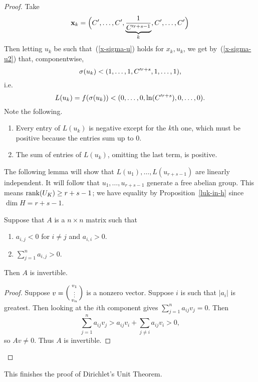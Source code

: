 \begin{proof}
Take
\[
\mathbf x_k=\Big(C',\ldots, C', \underbrace{\frac{1}{C'^{r+s-1}}}_{k},C',\ldots, C'\Big)
\]
Then letting $u_k$ be such that~(\ref{x-sigma-u}) holds for $x_k,u_k$, we get by~(\ref{x-sigma-u2}) that, componentwise,
\[
\sigma(u_k)< (1,\ldots,1, C'^{r+s},1, \ldots, 1), 
\]
i.e.
\[
L(u_k)=f(\sigma(u_k))<(0,\ldots, 0, \ln(C'^{r+s}),0,\ldots, 0).
\]
Note the following.
\begin{enumerate}
\item Every entry of $L(u_k)$ is negative except for the $k$th one, which must be positive because the entries sum up to 0.
\item The sum of entries of $L(u_k)$, omitting the last term, is positive. 
\end{enumerate}
The following lemma will show that $L(u_1),\ldots, L(u_{r+s-1})$ are linearly independent. It will follow that $u_1,\ldots, u_{r+s-1}$ generate a free abelian group. This means $\operatorname{rank}(U_K)\ge r+s-1$; we have equality by Proposition~\ref{luk-in-h} since $\dim H=r+s-1$.
\begin{lem}
Suppose that $A$ is a $n\times n$ matrix such that
\begin{enumerate}
\item $a_{i,j}<0$ for $i\ne j$ and $a_{i,i}>0$.
\item $\sum_{j=1}^n a_{i,j}>0$.
\end{enumerate}
Then %
$A$ is invertible.
\end{lem}
\begin{proof}
Suppose $v=\left( {\begin{smallmatrix}{v_1}\\{\vdots }\\{v_n}\end{smallmatrix}} \right)$ is a nonzero vector.
Suppose $i$ is such that $|a_i|$ is greatest. Then looking at the $i$th component gives $\sum_{j=1}^n a_{ij}v_j=0$. Then
\[
\sum_{j=1}^n a_{ij}v_j>a_{ij}v_i+\sum_{j\ne i} a_{ij}v_i>0,
\]
so $Av\ne 0$. Thus $A$ is invertible.
\end{proof}
\end{proof}
This finishes the proof of Dirichlet's Unit Theorem.
